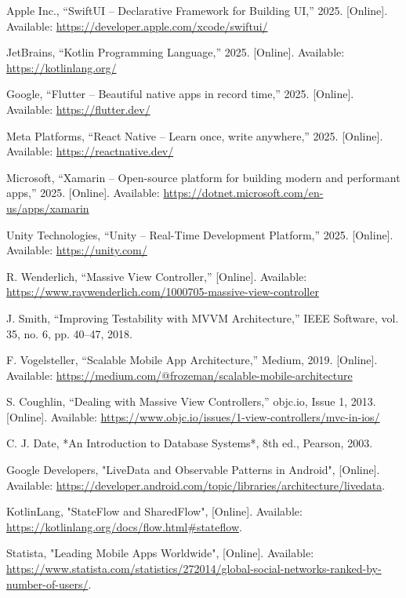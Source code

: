 \documentclass[12pt]{report}
\begin{document}
\begin{thebibliography}{1}
  Apple Inc., ``SwiftUI – Declarative Framework for Building UI,'' 2025. [Online]. Available: \url{https://developer.apple.com/xcode/swiftui/}

  JetBrains, ``Kotlin Programming Language,'' 2025. [Online]. Available: \url{https://kotlinlang.org/}

  Google, ``Flutter – Beautiful native apps in record time,'' 2025. [Online]. Available: \url{https://flutter.dev/}

  Meta Platforms, ``React Native – Learn once, write anywhere,'' 2025. [Online]. Available: \url{https://reactnative.dev/}

  Microsoft, ``Xamarin – Open-source platform for building modern and performant apps,'' 2025. [Online]. Available: \url{https://dotnet.microsoft.com/en-us/apps/xamarin}

  Unity Technologies, ``Unity – Real-Time Development Platform,'' 2025. [Online]. Available: \url{https://unity.com/}


  R. Wenderlich, ``Massive View Controller,'' [Online]. Available: \url{https://www.raywenderlich.com/1000705-massive-view-controller}


  J. Smith, ``Improving Testability with MVVM Architecture,'' IEEE Software, vol. 35, no. 6, pp. 40–47, 2018.

  F. Vogelsteller, ``Scalable Mobile App Architecture,'' Medium, 2019. [Online]. Available: \url{https://medium.com/@frozeman/scalable-mobile-architecture}

  S. Coughlin, ``Dealing with Massive View Controllers,'' objc.io, Issue 1, 2013. [Online]. Available: \url{https://www.objc.io/issues/1-view-controllers/mvc-in-ios/}
  

  C. J. Date, *An Introduction to Database Systems*, 8th ed., Pearson, 2003.
  
  Google Developers, "LiveData and Observable Patterns in Android", [Online]. Available: \url{https://developer.android.com/topic/libraries/architecture/livedata}.
  
  KotlinLang, "StateFlow and SharedFlow", [Online]. Available: \url{https://kotlinlang.org/docs/flow.html#stateflow}.
  
  Statista, "Leading Mobile Apps Worldwide", [Online]. Available: \url{https://www.statista.com/statistics/272014/global-social-networks-ranked-by-number-of-users/}.
  



\end{thebibliography}
\end{document}
